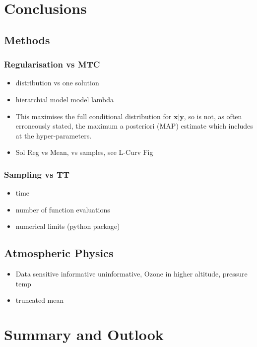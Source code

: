 \chapter{Conclusions}
\label{ch:Concl}

\section{Methods}

\subsection{Regularisation vs MTC}
\begin{itemize}
	\item distribution vs one solution
	\item hierarchial model model lambda
	\item This maximises the full conditional distribution for $\bm{x}|\bm{y}$, so is not, as often erroneously stated, the maximum a posteriori (MAP) estimate which includes at the hyper-parameters.
	\item Sol Reg vs Mean, vs samples, see L-Curv Fig
\end{itemize}

\subsection{Sampling vs TT}
\begin{itemize}
	\item time
	\item number of function evaluations
	\item numerical limits (python package)
\end{itemize}

\section{Atmospheric Physics}
\begin{itemize}
	\item Data sensitive informative uninformative, Ozone in higher altitude, pressure  temp
	\item truncated mean
\end{itemize}


\chapter{Summary and Outlook}
\label{ch:SumOut}

